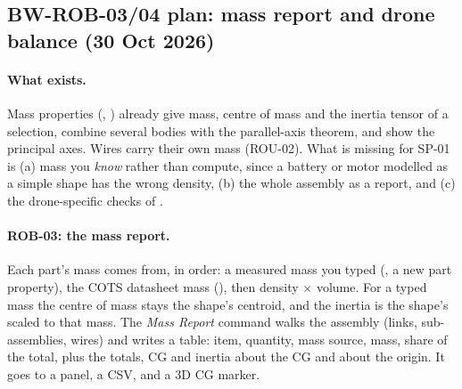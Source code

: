 \subsection{BW-ROB-03/04 plan: mass report and drone balance (30 Oct 2026)}\label{sec:rob0304-plan}

\paragraph{What exists.} Mass properties (, ) already give mass,
centre of mass and the inertia tensor of a selection, combine several bodies with the parallel-axis theorem,
and show the principal axes. Wires carry their own mass (ROU-02). What is missing for SP-01 is (a) mass you
\emph{know} rather than compute, since a battery or motor modelled as a simple shape has the wrong density, (b) the
whole assembly as a report, and (c) the drone-specific checks of .

\paragraph{ROB-03: the mass report.} Each part's mass comes from, in order: a measured mass you typed
(, a new part property), the COTS datasheet mass (), then density
$\times$ volume. For a typed mass the centre of mass stays the shape's centroid, and the inertia is the shape's
scaled to that mass. The \emph{Mass Report} command walks the assembly (links, sub-assemblies, wires) and writes a
table: item, quantity, mass source, mass, share of the total, plus the totals, CG and inertia about the CG and
about the origin. It goes to a panel, a CSV, and a 3D CG marker.

